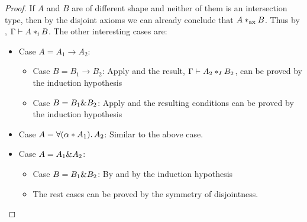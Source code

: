 \begin{proof}

  If $A$ and $B$ are of different shape and neither of them is an intersection
  type, then by the disjoint axioms we can already conclude that $A *_\textnormal{ax}
  B$. Thus by , $\Gamma \vdash A *_\textnormal{i} B$. The other
  interesting cases are:

  \begin{itemize}

    \item Case $A = A_1 \to A_2$:

    \begin{itemize}

      \item Case $B = B_1 \to B_2$:
      Apply  and the result, $\Gamma \vdash A_2 *_I B_2$,
      can be proved by the induction hypothesis

      \item Case $B = B_1 \& B_2$: Apply  and the
      resulting conditions can be proved by the induction hypothesis

    \end{itemize}
    \item Case $A = \forall (\alpha * A_1).\, A_2$: Similar to the above case.


    \item Case $A = A_1 \& A_2$:

    \begin{itemize}
      \item Case $B = B_1 \& B_2$: By  and by the induction hypothesis
      \item The rest cases can be proved by the symmetry of disjointness.
    \end{itemize}

  \end{itemize}
\end{proof}
